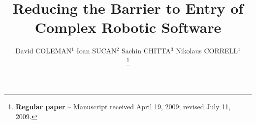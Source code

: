 \documentclass[10pt,journal,compsoc]{joser1}
\begin{document}
\title{Reducing the Barrier to Entry of \\\baselineskip Complex Robotic Software}

\author{
David COLEMAN$^{1}$
\qquad
Ioan SUCAN$^{2}$
\qquad
Sachin CHITTA$^{3}$
\qquad
Nikolaus CORRELL$^{1}$

\thanks{{\bf Regular paper} -- Manuscript received April 19, 2009;
revised July 11, 2009.}



} %

\address{
$^1$ Dept. of Computer Science, University of Colorado at Boulder, 430 UCB, Boulder, CO 80309\\
$^2$ Willow Garage, Inc., 68 Willow Road, Menlo Park, CA 94025\\
$^3$ SRI International, 333 Ravenswood Avenue, Menlo Park, CA 94025
}


\markboth
\end{document}
